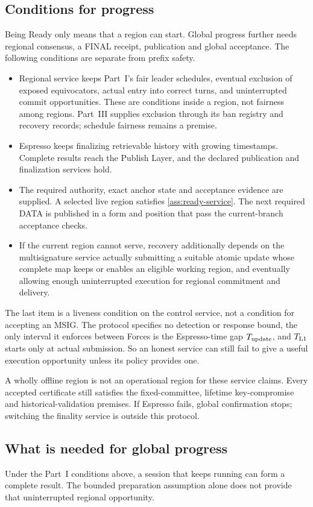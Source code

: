 \documentclass[11pt,a4paper]{article}
\newcounter{protocol}
\begin{document}
\subsection{Conditions for progress}
\label{sec:progress}
Being Ready only means that a region can start. Global progress further
needs regional consensus, a FINAL receipt, publication and global
acceptance. The following conditions are separate from prefix safety.
\begin{itemize}
\item Regional service keeps Part~I's fair leader schedules, eventual
exclusion of exposed equivocators, actual entry into correct turns, and
uninterrupted commit opportunities. These are conditions inside a region,
not fairness among regions. Part~III supplies exclusion through its ban
registry and recovery records; schedule fairness remains a premise.
\item Espresso keeps finalizing retrievable history with growing
timestamps. Complete results reach the Publish Layer, and the declared
publication and finalization services hold.
\item The required authority, exact anchor state and acceptance evidence
are supplied. A selected live region satisfies \cref{ass:ready-service}.
The next required DATA is published in a form and position that pass the
current-branch acceptance checks.
\item If the current region cannot serve, recovery additionally depends
on the multisignature service actually submitting a suitable atomic
update whose complete map keeps or enables an eligible working region,
and eventually allowing
enough uninterrupted execution for regional commitment and delivery.
\end{itemize}
The last item is a liveness condition on the control service, not a
condition for accepting an MSIG. The protocol specifies no detection or
response bound, the only interval it enforces between Forces is the
Espresso-time gap $T_{\rm update}$, and $T_{\rm L1}$ starts only at actual
submission. So an honest service can still fail to
give a useful execution opportunity unless its policy provides one.

A wholly offline region is not an operational region for these service
claims. Every accepted certificate still satisfies the fixed-committee,
lifetime key-compromise and historical-validation premises. If Espresso fails, global confirmation stops; switching the
finality service is outside this protocol.

\subsection{What is needed for global progress}
\label{sec:global-progress}
Under the Part~I conditions above, a session that keeps running can form
a complete result. The bounded preparation assumption alone does not
provide that uninterrupted regional opportunity.
\end{document}
